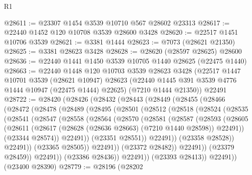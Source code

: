 \begin{lexlean}{R1}
\begin{coremodule}
@28611 := @23307 @1454 @3539 @10710 @567 @28602 @23313
@28617 := @22440 @1452 @120 @10708 @3539 @28600 @3428
@28620 := @22517 @1451 @10706 @3539
@28621 := @3381 @1444
@28623 := @7073 (@28621 @21350)
@28625 := @3381 @28623 @3428
@28628 := @28620 (@28597 @28625) @28600
@28636 := @22440 @1441 @1450 @3539 @10705 @1440 @28625 (@22475 @1440)
@28663 := @22440
    @1448
    @120
    @10703
    @3539
    @28623
    @3428
    (@22517
      @1447
      @10701
      @3539
      (@28621 @10947)
      @28623
      (@22440 @1445 @391 @3539 @4776 @1444 @10947 (@22475 @1444) @22625)
      (@7210 @1444 @21350))
    @22491
@28722 := @28420
    (@28426
      (@28432
        (@28443
          (@28449
            (@28455
              (@28466
                (@28472
                  (@28478
                    (@28489
                      (@28495
                        (@28501
                          (@28512
                            (@28518
                              (@28524
                                (@28535
                                  (@28541
                                    (@28547
                                      (@28558
                                        (@28564
                                          (@28570
                                            (@28581
                                              (@28587
                                                (@28593
                                                  (@28605
                                                    (@28611
                                                      (@28617
                                                        (@28628
                                                          (@28636 @28663)
                                                          (@7210 @1440 @28598))
                                                        @22491))
                                                    (@23344 @28574))
                                                  @22491))
                                              (@23351 @28551))
                                            @22491))
                                        (@23358 @28528))
                                      @22491))
                                  (@23365 @28505))
                                @22491))
                            (@23372 @28482))
                          @22491))
                      (@23379 @28459))
                    @22491))
                (@23386 @28436))
              @22491))
          (@23393 @28413))
        @22491))
    (@23400 @28390)
@28779 := @28196
    (@28202

\end{coremodule}
\end{lexlean}
